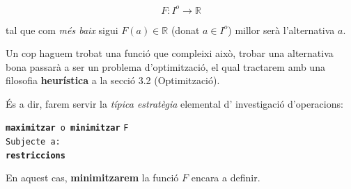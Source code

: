 \documentclass[10pt,twocolumn]{article}
\newcommand{\R}{\ensuremath{\mathbb{R}}}
\begin{document}
$$F: I^o \longrightarrow \R$$

tal que com \textit{més baix} sigui $F(a) \in \R$ (donat $a \in I^o$) millor serà l'alternativa $a$.

Un cop haguem trobat una funció que compleixi això, trobar una alternativa bona passarà a ser un problema d'optimització, el qual tractarem amb una filosofia \textbf{heurística} a la secció 3.2 (Optimització).

És a dir, farem servir la \textit{típica estratègia} elemental d' investigació d'operacions:
\vspace{3 mm}

\begin{tcolorbox}
	\texttt{\textbf{maximitzar} o \textbf{minimitzar}} \texttt{F}
	\\ 
	\texttt{Subjecte a:}
	\\
	\text{ } \hspace{10mm} \texttt{\textbf{restriccions}}
\end{tcolorbox}
En aquest cas, \textbf{minimitzarem} la funció $F$ encara a definir.
\vspace{3mm}
\end{document}
